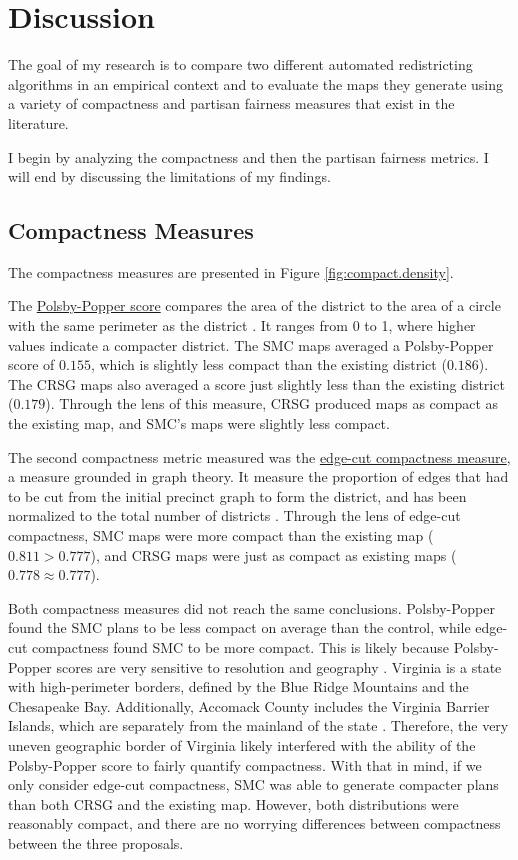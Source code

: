 \section{Discussion}
\label{sec:disc}

The goal of my research is to compare two different automated redistricting algorithms in an empirical context and to evaluate the maps they generate using a variety of compactness and partisan fairness measures that exist in the literature. 

I begin by analyzing the compactness and then the partisan fairness metrics. I will end by discussing the limitations of my findings. 

\subsection{Compactness Measures}

The compactness measures are presented in Figure \ref{fig:compact.density}. 

The \hyperref[sec:polsbypopper]{Polsby-Popper score} compares the area of the district to the area of a circle with the same perimeter as the district \parencite{polsby1991}. It ranges from 0 to 1, where higher values indicate a compacter district. The SMC maps averaged a Polsby-Popper score of $0.155$, which is slightly less compact than the existing district ($0.186$). The CRSG maps also averaged a score just slightly less than the existing district ($0.179$). Through the lens of this measure, CRSG produced maps as compact as the existing map, and SMC's maps were slightly less compact. 

The second compactness metric measured was the \hyperref[sec:edgecut]{edge-cut compactness measure}, a measure grounded in graph theory. It measure the proportion of edges that had to be cut from the initial precinct graph to form the district, and has been normalized to the total number of districts \parencite{dube2016}. Through the lens of edge-cut compactness, SMC maps were more compact than the existing map ($0.811 > 0.777$), and CRSG maps were just as compact as existing maps ($0.778 \approx 0.777$). 

Both compactness measures did not reach the same conclusions. Polsby-Popper found the SMC plans to be less compact on average than the control, while edge-cut compactness found SMC to be more compact. This is likely because Polsby-Popper scores are very sensitive to resolution and geography \parencite{mccartan2020}. Virginia is a state with high-perimeter borders, defined by the Blue Ridge Mountains and the Chesapeake Bay. Additionally, Accomack County includes the Virginia Barrier Islands, which are separately from the mainland of the state \parencite{unitedstatesgeologicalsurvey2021}. Therefore, the very uneven geographic border of Virginia likely interfered with the ability of the Polsby-Popper score to fairly quantify compactness. With that in mind, if we only consider edge-cut compactness, SMC was able to generate compacter plans than both CRSG and the existing map. However, both distributions were reasonably compact, and there are no worrying differences between compactness between the three proposals. 

